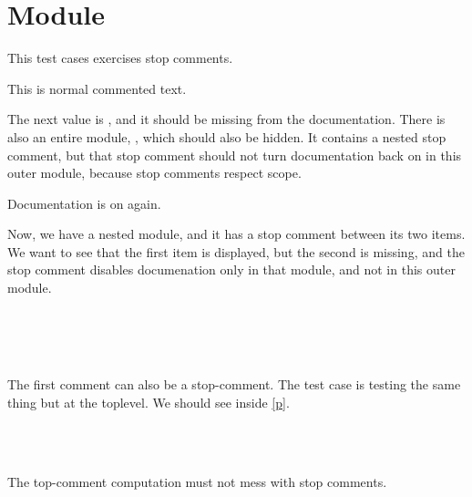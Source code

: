 \section{Module }\label{Stop}%
This test cases exercises stop comments.

\label{Stop--val-foo}\begin{ocamlindent}This is normal commented text.\end{ocamlindent}%
\medbreak
The next value is , and it should be missing from the documentation. There is also an entire module, , which should also be hidden. It contains a nested stop comment, but that stop comment should not turn documentation back on in this outer module, because stop comments respect scope.

Documentation is on again.

Now, we have a nested module, and it has a stop comment between its two items. We want to see that the first item is displayed, but the second is missing, and the stop comment disables documenation only in that module, and not in this outer module.

\label{Stop--module-N}\label{Stop-N}\begin{ocamlindent}\label{Stop-N--val-quux}\\
\end{ocamlindent}%
\\
\label{Stop--val-lol}\\
The first comment can also be a stop-comment. The test case  is testing the same thing but at the toplevel. We should see  inside \hyperref[Stop-O]{[p\pageref*{Stop-O}]}.

\label{Stop--module-O}\label{Stop-O}\begin{ocamlindent}\label{Stop-O--val-bar}\\
\end{ocamlindent}%
\\
The top-comment computation must not mess with stop comments.

